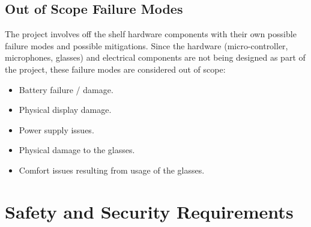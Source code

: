 \documentclass{article}
\begin{document}
\restoregeometry

\pdfpagewidth=8.5in \pdfpageheight=11in

\subsection{Out of Scope Failure Modes}
The project involves off the shelf hardware components with their own possible
failure modes and possible mitigations. Since the hardware (micro-controller, 
microphones, glasses) and electrical components are not being designed as 
part of the project, these failure modes are considered out of scope:
\begin{itemize}
    \item Battery failure / damage.
    \item Physical display damage.
    \item Power supply issues.
    \item Physical damage to the glasses.
    \item Comfort issues resulting from usage of the glasses.
\end{itemize}


\section{Safety and Security Requirements}
\end{document}
